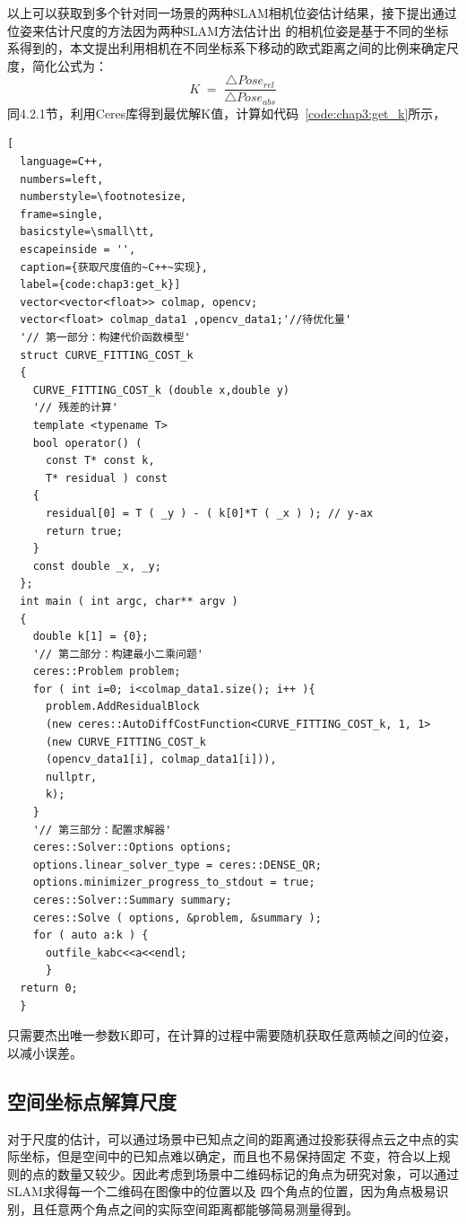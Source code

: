 以上可以获取到多个针对同一场景的两种SLAM相机位姿估计结果，接下提出通过位姿来估计尺度的方法因为两种SLAM方法估计出
的相机位姿是基于不同的坐标系得到的，本文提出利用相机在不同坐标系下移动的欧式距离之间的比例来确定尺度，简化公式为：
\begin{equation}K\;=\;\frac{\triangle Pose_{rel}}{\triangle Pose_{abs}}  
\label{equ:getVolume_K}\end{equation}
同4.2.1节，利用Ceres库得到最优解K值，计算如代码~\ref{code:chap3:get_k}所示，
\begin{lstlisting}[
  language=C++,
  numbers=left,                
  numberstyle=\footnotesize,
  frame=single,     
  basicstyle=\small\tt,    
  escapeinside = '',
  caption={获取尺度值的~C++~实现},
  label={code:chap3:get_k}]
  vector<vector<float>> colmap, opencv;
  vector<float> colmap_data1 ,opencv_data1;'//待优化量'
  '// 第一部分：构建代价函数模型'
  struct CURVE_FITTING_COST_k
  {
    CURVE_FITTING_COST_k (double x,double y)
    '// 残差的计算'
    template <typename T>
    bool operator() (
      const T* const k,     
      T* residual ) const     
    {
      residual[0] = T ( _y ) - ( k[0]*T ( _x ) ); // y-ax
      return true;
    }
    const double _x, _y;
  };
  int main ( int argc, char** argv )
  {   
    double k[1] = {0};
    '// 第二部分：构建最小二乘问题'
    ceres::Problem problem;
    for ( int i=0; i<colmap_data1.size(); i++ ){
      problem.AddResidualBlock 
      (new ceres::AutoDiffCostFunction<CURVE_FITTING_COST_k, 1, 1>
      (new CURVE_FITTING_COST_k 
      (opencv_data1[i], colmap_data1[i])),
      nullptr,
      k);
    }
    '// 第三部分：配置求解器'
    ceres::Solver::Options options;   
    options.linear_solver_type = ceres::DENSE_QR;  
    options.minimizer_progress_to_stdout = true;  
    ceres::Solver::Summary summary;              
    ceres::Solve ( options, &problem, &summary );  
    for ( auto a:k ) {
      outfile_kabc<<a<<endl;
      }
  return 0;
  }
\end{lstlisting}
只需要杰出唯一参数K即可，在计算的过程中需要随机获取任意两帧之间的位姿，以减小误差。
\subsection{空间坐标点解算尺度}
对于尺度的估计，可以通过场景中已知点之间的距离通过投影获得点云之中点的实际坐标，但是空间中的已知点难以确定，而且也不易保持固定
不变，符合以上规则的点的数量又较少。因此考虑到场景中二维码标记的角点为研究对象，可以通过SLAM求得每一个二维码在图像中的位置以及
四个角点的位置，因为角点极易识别，且任意两个角点之间的实际空间距离都能够简易测量得到。

